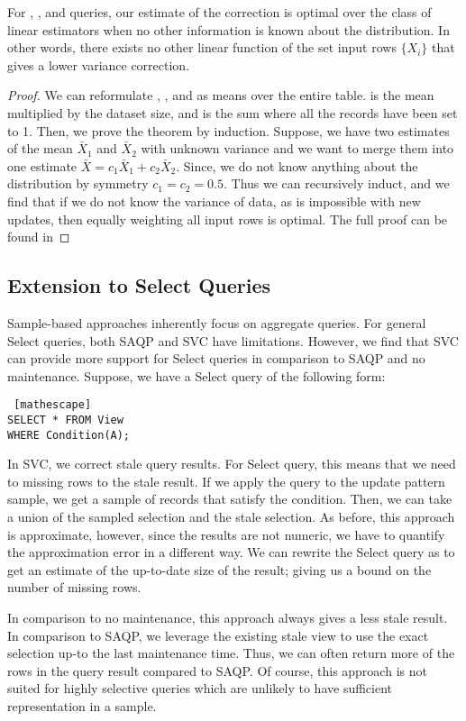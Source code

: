 \begin{theorem}
For \sumfunc, \countfunc, and \avgfunc queries, our estimate of the correction is optimal over the class of linear estimators when no other information is known about the distribution. 
In other words, there exists no other linear function of the set input rows $\{ X_i \}$ that gives a lower variance correction.
\end{theorem}
\begin{proof}
We can reformulate \sumfunc, \countfunc, and \avgfunc as means over the entire table. \sumfunc is the mean multiplied by the dataset size, and \countfunc
is the sum where all the records have been set to 1. Then, we prove the theorem by induction. 
Suppose, we have two estimates of the mean $\bar{X}_1$ and $\bar{X}_2$ with unknown variance and we want to merge them into one estimate $\bar{X} = c_1\bar{X}_1+c_2\bar{X}_2$.
Since, we do not know anything about the distribution by symmetry $c_1 = c_2 = 0.5$. 
Thus we can recursively induct, and we find that if we do not know the variance of data, as is impossible with new updates, then equally weighting all input rows is optimal. 
The full proof can be found in 
\end{proof}

\subsection{Extension to Select Queries}
Sample-based approaches inherently focus on aggregate queries.
For general Select queries, both SAQP and SVC have limitations.
However, we find that SVC can provide more support for Select queries in comparison to SAQP and no maintenance.
Suppose, we have a Select query of the following form:
\begin{lstlisting} [mathescape]
SELECT * FROM View 
WHERE Condition(A);
\end{lstlisting}
In SVC, we correct stale query results.
For Select query, this means that we need to missing rows to the stale result.
If we apply the query to the update pattern sample, we get a sample of records that satisfy the condition.
Then, we can take a union of the sampled selection and the stale selection.
As before, this approach is approximate, however, since the results are not numeric, we have to quantify the approximation error in a different way.
We can rewrite the Select query as \countfunc to get an estimate of the up-to-date size of the result; giving us a bound on 
the number of missing rows.

In comparison to no maintenance, this approach always gives a less stale result.
In comparison to SAQP, we leverage the existing stale view to use the exact selection up-to the last maintenance time.
Thus, we can often return more of the rows in the query result compared to SAQP.
Of course, this approach is not suited for highly selective queries which are unlikely to have sufficient representation in a sample.
